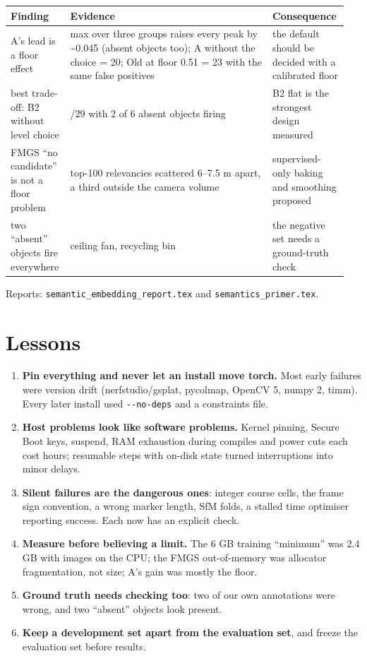 \documentclass[11pt,a4paper]{article}
\newcommand{\code}[1]{\texttt{#1}}
\begin{document}
\begin{center}\small
\begin{tabular}{@{}>{\raggedright\arraybackslash}p{0.162\linewidth}>{\raggedright\arraybackslash}p{0.582\linewidth}>{\raggedright\arraybackslash}p{0.204\linewidth}@{}}
\toprule
\textbf{Finding} & \textbf{Evidence} & \textbf{Consequence} \\
\midrule
A's lead is a floor effect & max over three groups raises every peak by \textasciitilde{}0.045 (absent objects too); A without the choice = 20; Old at floor 0.51 = 23 with the same false positives & the default should be decided with a calibrated floor \\
best trade-off: B2 without level choice & 24/29 with 2 of 6 absent objects firing & B2 flat is the strongest design measured \\
FMGS ``no candidate'' is not a floor problem & top-100 relevancies scattered 6–7.5 m apart, a third outside the camera volume & supervised-only baking and smoothing proposed \\
two ``absent'' objects fire everywhere & ceiling fan, recycling bin & the negative set needs a ground-truth check \\
\bottomrule
\end{tabular}
\end{center}
Reports: \code{semantic\_\allowbreak{}embedding\_\allowbreak{}report.tex} and \code{semantics\_\allowbreak{}primer.tex}.

\section{Lessons}
\begin{enumerate}
  \item \textbf{Pin everything and never let an install move torch.} Most early failures were version drift (nerfstudio/gsplat, pycolmap, OpenCV 5, numpy 2, timm). Every later install used \code{-{}-no-deps} and a constraints file.
  \item \textbf{Host problems look like software problems.} Kernel pinning, Secure Boot keys, suspend, RAM exhaustion during compiles and power cuts each cost hours; resumable steps with on-disk state turned interruptions into minor delays.
  \item \textbf{Silent failures are the dangerous ones}: integer course cells, the frame sign convention, a wrong marker length, SfM folds, a stalled time optimiser reporting success. Each now has an explicit check.
  \item \textbf{Measure before believing a limit.} The 6 GB training ``minimum'' was 2.4 GB with images on the CPU; the FMGS out-of-memory was allocator fragmentation, not size; A's gain was mostly the floor.
  \item \textbf{Ground truth needs checking too}: two of our own annotations were wrong, and two ``absent'' objects look present.
  \item \textbf{Keep a development set apart from the evaluation set}, and freeze the evaluation set before results.
\end{enumerate}
\end{document}
